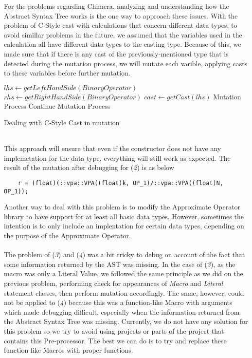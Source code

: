 For the problems regarding Chimera, analyzing and understanding how the Abstract Syntax Tree works is the one way to approach these issues. With the problem of C-Style cast with calculations that concern different data types, to avoid simillar problems in the future, we assumed that the variables used in the calculation all have different data types to the casting type. Because of this, we made sure that if there is any cast of the previously-mentioned type that is detected during the mutation process, we will mutate each varible, applying casts to these variables before further mutation. \\
\begin{algorithm}[H]
\SetAlgoLined
{}
$lhs \leftarrow getLeftHandSide(BinaryOperator)$\;
$rhs \leftarrow getRightHandSide(BinaryOperator)$\;
$cast \leftarrow getCast(lhs)$\;
Mutation Process\;
Continue Mutation Process\;
\caption{Dealing with C-Style Cast in mutation}
\end{algorithm}
~\\
This approach will ensure that even if the constructor does not have any implemetation for the data type, everything will still work as expected. The result of the mutation after debugging for (\textit{2}) is as below
\begin{verbatim}
	r = (float)(::vpa::VPA((float)k, OP_1)/::vpa::VPA((float)N, OP_1));
\end{verbatim}
Another way to deal with this problem is to modify the Approximate Operator library to have support for at least all basic data types. However, sometimes the intention is to only include an implentation for certain data types, depending on the purpose of the Approximate Operator. \\
~\\
The problem of (\textit{3}) and (\textit{4}) was a bit tricky to debug on account of the fact that some information returned by the AST was missing. In the case of (\textit{3}), as the macro was only a Literal Value, we followed the same principle as we did on the previous problem, performing check for appearances of \textit{Macro} and \textit{Literal} statement classes, then perform mutation accordingly. The same, however, could not be applied to (\textit{4}) because this was a function-like Macro with arguments which made debugging difficult, especially when the information returned from the Abstract Syntax Tree was missing. Currently, we do not have any solution for this problem so we try to avoid using projects or parts of the project that contains this Pre-processor. The best we can do is to try and replace these function-like Macros with proper functions. \\
